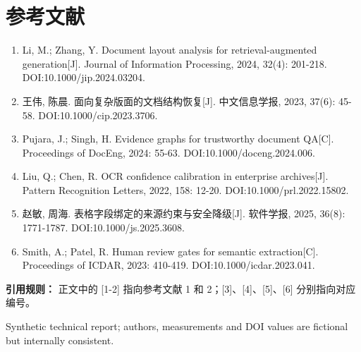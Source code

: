 \documentclass[10.5pt,a4paper]{article}
\begin{document}
\section*{参考文献}
\begin{enumerate}
\item Li, M.; Zhang, Y. Document layout analysis for retrieval-augmented generation[J]. Journal of Information Processing, 2024, 32(4): 201-218. DOI:10.1000/jip.2024.03204.
\item 王伟, 陈晨. 面向复杂版面的文档结构恢复[J]. 中文信息学报, 2023, 37(6): 45-58. DOI:10.1000/cip.2023.3706.
\item Pujara, J.; Singh, H. Evidence graphs for trustworthy document QA[C]. Proceedings of DocEng, 2024: 55-63. DOI:10.1000/doceng.2024.006.
\item Liu, Q.; Chen, R. OCR confidence calibration in enterprise archives[J]. Pattern Recognition Letters, 2022, 158: 12-20. DOI:10.1000/prl.2022.15802.
\item 赵敏, 周海. 表格字段绑定的来源约束与安全降级[J]. 软件学报, 2025, 36(8): 1771-1787. DOI:10.1000/js.2025.3608.
\item Smith, A.; Patel, R. Human review gates for semantic extraction[C]. Proceedings of ICDAR, 2023: 410-419. DOI:10.1000/icdar.2023.041.
\end{enumerate}
\vspace{6mm}
\textbf{引用规则：} 正文中的 [1-2] 指向参考文献 1 和 2；[3]、[4]、[5]、[6] 分别指向对应编号。\par
\vfill\color{gray}\small Synthetic technical report; authors, measurements and DOI values are fictional but internally consistent.
\end{document}
